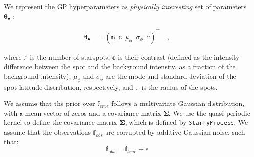 \documentclass[twocolumn]{aastex631}
\begin{document}
We represent the GP hyperparameters as \emph{physically interesting} set of parameters $\pmb{\theta}_\bullet$ \citep{Luger2021b}:
%
\begin{linenomath}\begin{align}
        \label{eq:thetaspot}
        \pmb{\theta}_\bullet
         & =
        \left(
        \mathbb{n}
        \,\,\,
        \mathbb{c}
        \,\,\,
        \mu_\phi
        \,\,\,
        \sigma_\phi
        \,\,\,
        \mathbb{r}
        \right)^\top
        \quad,
    \end{align}\end{linenomath}
%
where $\mathbb{n}$ is the number of starspots, $\mathbb{c}$ is their contrast (defined as the intensity difference between the spot and the 
background intensity, as a fraction of the background intensity),
$\mu_\phi$ and $\sigma_\phi$ are the mode and standard deviation
of the spot latitude distribution, respectively, and $\mathbb{r}$ is the radius
of the spots.

We assume that the prior over $\mathbb{f}_{true}$ follows a multivariate Gaussian distribution, with a mean vector of zeros and a covariance 
matrix $\pmb{\Sigma}$. We use the quasi-periodic kernel to define the covariance matrix $\pmb{\Sigma}$, which is defined by \texttt{StarryProcess}.
We assume that the observations $\mathbb{f}_{obs}$ are corrupted by additive Gaussian noise, such that:
\begin{equation}
    \mathbb{f}_{obs} = \mathbb{f}_{true} + \epsilon
\end{equation}
\end{document}
